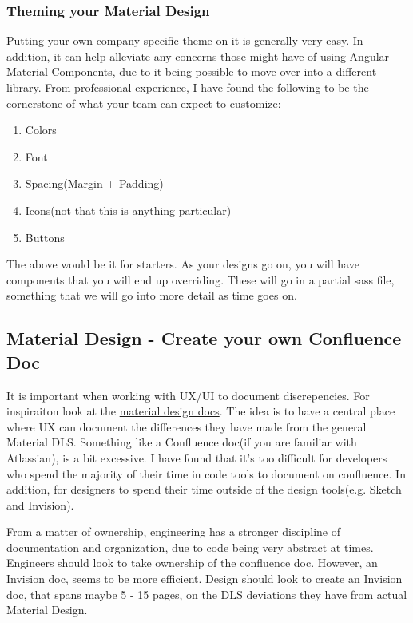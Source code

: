 \subsubsection{Theming your Material Design}
Putting your own company specific theme on it is generally very easy. In
addition, it can help alleviate any concerns those might have of using Angular
Material Components, due to it being possible to move over into a different
library. From professional experience, I have found the following to be the
cornerstone of what your team can expect to customize:
\begin{enumerate}
  \item Colors
  \item Font
  \item Spacing(Margin + Padding)
  \item Icons(not that this is anything particular)
  \item Buttons
\end{enumerate}

The above would be it for starters. As your designs go on, you will have
components that you will end up overriding. These will go in a partial sass
file, something that we will go into more detail as time goes on.

\subsection{ Material Design - Create your own Confluence Doc }
It is important when working with UX/UI to document discrepencies. For
inspiraiton look at the \href{https://material.io/guidelines/components/sliders.html}{material design docs}. The idea is to have a central place where UX can document the
differences they have made from the general Material DLS. Something like a
Confluence doc(if you are familiar with Atlassian), is a bit excessive. I have
found that it's too difficult for developers who spend the majority of their
time in code tools to document on confluence. In addition, for designers to
spend their time outside of the design tools(e.g. Sketch and Invision).

From a matter of ownership, engineering has a stronger discipline of
documentation and organization, due to code being very abstract at times.
Engineers should look to take ownership of the confluence doc. However, an
Invision doc, seems to be more efficient. Design should look to create an
Invision doc, that spans maybe 5 - 15 pages, on the DLS deviations they have
from actual Material Design.


